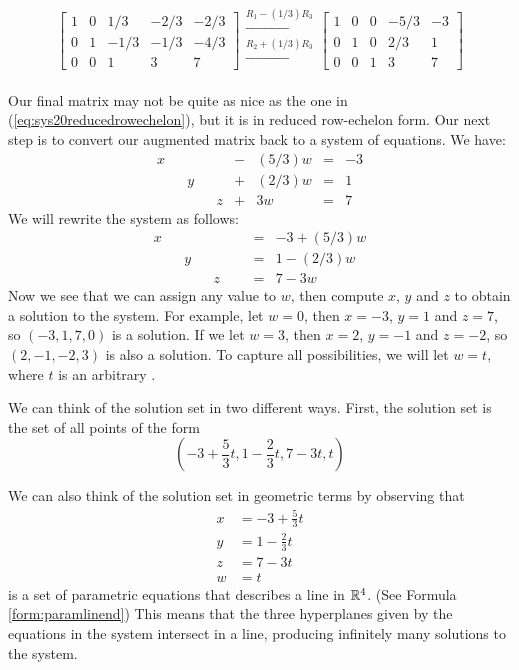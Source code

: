 \documentclass{ximera}
\begin{document}
\begin{example}
\begin{explanation}
 $$\left[\begin{array}{cccc|c}  
 1&0&1/3&-2/3&-2/3\\0&1&-1/3&-1/3&-4/3\\0&0&1&3&7
 \end{array}\right]
 \begin{array}{c}
 \xrightarrow{R_1-(1/3)R_3}\\
 \xrightarrow{R_2+(1/3)R_3}\\
\\
 \end{array}\left[\begin{array}{cccc|c}  
 1&0&0&-5/3&-3\\0&1&0&2/3&1\\0&0&1&3&7
 \end{array}\right]$$
 
 Our final matrix may not be quite as nice as the one in (\ref{eq:sys20reducedrowechelon}), but it is in reduced row-echelon form.  Our next step is to convert our augmented matrix back to a system of equations.  We have:
 $$\begin{array}{ccccccccc}
      x & &&&&-&(5/3)w&= &-3 \\
	 & &y&&&+&(2/3)w&=&1\\
     & &&&z&+&3w&=&7 
    \end{array}$$
 We will rewrite the system as follows:
 $$\begin{array}{ccccccccc}
      x & &&&&&&= &-3+(5/3)w \\
	 & &y&&&&&=&1-(2/3)w\\
     & &&&z&&&=&7-3w 
    \end{array}$$
 Now we see that we can assign any value to $w$, then compute $x$, $y$ and $z$ to obtain a solution to the system.  For example, let $w=0$, then $x=-3$, $y=1$ and $z=7$, so $(-3, 1, 7, 0)$ is a solution.  If we let $w=3$, then $x=2$, $y=-1$ and $z=-2$, so $(2, -1, -2, 3)$ is also a solution.   To capture all possibilities, we will let $w=t$, where $t$ is an arbitrary .   
 
  We can think of the solution set in two different ways.  First, the solution set is the set of all points of the form$$\left(-3+\frac{5}{3}t, 1-\frac{2}{3}t, 7-3t, t\right)$$ 
 
 We can also think of the solution set in geometric terms by observing that 
 \begin{align*}
 x&=-3+\frac{5}{3}t\\
 y&=1-\frac{2}{3}t\\
 z&=7-3t\\
 w&=t
 \end{align*}
 is a set of parametric equations that describes a line in $\mathbb{R}^4$.  (See Formula \ref{form:paramlinend})  This means that the three hyperplanes given by the equations in the system intersect in a line, producing infinitely many solutions to the system.

\end{explanation}
\end{example}
\end{document}
